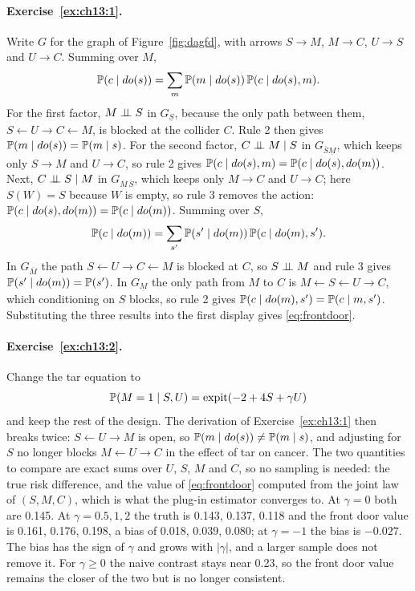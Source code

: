 \paragraph{Exercise~\ref{ex:ch13:1}.} Write $G$ for the graph of Figure~\ref{fig:dagfd}, with arrows $S \to M$, $M \to C$, $U \to S$ and $U \to C$. Summing over $M$,
\[
\mathbb{P}(c \mid do(s)) = \sum_m \mathbb{P}(m \mid do(s))\,\mathbb{P}(c \mid do(s), m).
\]
For the first factor, $M \perp\!\!\!\perp S$ in $G_{\underline{S}}$, because the only path between them, $S \leftarrow U \to C \leftarrow M$, is blocked at the collider $C$. Rule 2 then gives $\mathbb{P}(m \mid do(s)) = \mathbb{P}(m \mid s)$. For the second factor, $C \perp\!\!\!\perp M \mid S$ in $G_{\overline{S}\underline{M}}$, which keeps only $S \to M$ and $U \to C$, so rule 2 gives $\mathbb{P}(c \mid do(s), m) = \mathbb{P}(c \mid do(s), do(m))$. Next, $C \perp\!\!\!\perp S \mid M$ in $G_{\overline{M}\,\overline{S}}$, which keeps only $M \to C$ and $U \to C$; here $S(W) = S$ because $W$ is empty, so rule 3 removes the action: $\mathbb{P}(c \mid do(s), do(m)) = \mathbb{P}(c \mid do(m))$. Summing over $S$,
\[
\mathbb{P}(c \mid do(m)) = \sum_{s'} \mathbb{P}(s' \mid do(m))\,\mathbb{P}(c \mid do(m), s').
\]
In $G_{\overline{M}}$ the path $S \leftarrow U \to C \leftarrow M$ is blocked at $C$, so $S \perp\!\!\!\perp M$ and rule 3 gives $\mathbb{P}(s' \mid do(m)) = \mathbb{P}(s')$. In $G_{\underline{M}}$ the only path from $M$ to $C$ is $M \leftarrow S \leftarrow U \to C$, which conditioning on $S$ blocks, so rule 2 gives $\mathbb{P}(c \mid do(m), s') = \mathbb{P}(c \mid m, s')$. Substituting the three results into the first display gives \eqref{eq:frontdoor}.

\paragraph{Exercise~\ref{ex:ch13:2}.} Change the tar equation to
\[
\mathbb{P}(M = 1 \mid S, U) = \operatorname{expit}(-2 + 4S + \gamma U)
\]
and keep the rest of the design. The derivation of Exercise~\ref{ex:ch13:1} then breaks twice: $S \leftarrow U \to M$ is open, so $\mathbb{P}(m \mid do(s)) \neq \mathbb{P}(m \mid s)$, and adjusting for $S$ no longer blocks $M \leftarrow U \to C$ in the effect of tar on cancer. The two quantities to compare are exact sums over $U$, $S$, $M$ and $C$, so no sampling is needed: the true risk difference, and the value of \eqref{eq:frontdoor} computed from the joint law of $(S, M, C)$, which is what the plug-in estimator converges to. At $\gamma = 0$ both are 0.145. At $\gamma = 0.5, 1, 2$ the truth is 0.143, 0.137, 0.118 and the front door value is 0.161, 0.176, 0.198, a bias of 0.018, 0.039, 0.080; at $\gamma = -1$ the bias is $-0.027$. The bias has the sign of $\gamma$ and grows with $|\gamma|$, and a larger sample does not remove it. For $\gamma \geq 0$ the naive contrast stays near 0.23, so the front door value remains the closer of the two but is no longer consistent.

